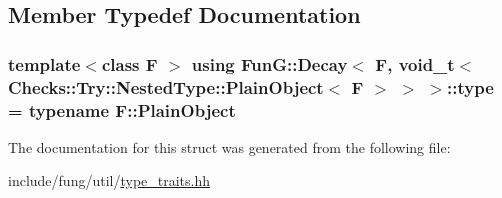 \subsection{Member Typedef Documentation}
\hypertarget{structFunG_1_1Decay_3_01F_00_01void__t_3_01Checks_1_1Try_1_1NestedType_1_1PlainObject_3_01F_01_4_01_4_01_4_a27b32af38cd1fb109944b71825771648}{
\subsubsection[{type}]{\setlength{\rightskip}{0pt plus 5cm}template$<$class F $>$ using {\bf Fun\-G\-::\-Decay}$<$ F, {\bf void\-\_\-t}$<$ Checks\-::\-Try\-::\-Nested\-Type\-::\-Plain\-Object$<$ F $>$ $>$ $>$\-::{\bf type} =  typename F\-::\-Plain\-Object}}\label{structFunG_1_1Decay_3_01F_00_01void__t_3_01Checks_1_1Try_1_1NestedType_1_1PlainObject_3_01F_01_4_01_4_01_4_a27b32af38cd1fb109944b71825771648}


The documentation for this struct was generated from the following file\-:\begin{DoxyCompactItemize}
\item 
include/fung/util/\hyperlink{type__traits_8hh}{type\-\_\-traits.\-hh}\end{DoxyCompactItemize}
